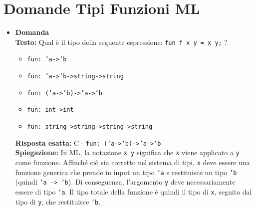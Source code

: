 \documentclass[12pt, a4paper]{article}
\newcounter{domandateoria}
\begin{document}
\section{Domande Tipi Funzioni ML}

\begin{itemize}
    \item {}\textbf{Domanda \thedomandateoria} \\
    \textbf{Testo:} Qual è il tipo della seguente espressione: \texttt{fun f x y = x y;} ?
    \begin{itemize}
        \item[A)] \texttt{fun: 'a->'b}
        \item[B)] \texttt{fun: 'a->'b->string->string}
        \item[C)] \texttt{fun: ('a->'b)->'a->'b}
        \item[D)] \texttt{fun: int->int}
        \item[E)] \texttt{fun: string->string->string->string}
    \end{itemize}
    \textbf{Risposta esatta:} C - \texttt{fun: ('a->'b)->'a->'b} \\
    \textbf{Spiegazione:} In ML, la notazione \texttt{x y} significa che \texttt{x} viene applicato a \texttt{y} come funzione. Affinché ciò sia corretto nel sistema di tipi, \texttt{x} deve essere una funzione generica che prende in input un tipo \texttt{'a} e restituisce un tipo \texttt{'b} (quindi \texttt{'a -> 'b}). Di conseguenza, l'argomento \texttt{y} deve necessariamente essere di tipo \texttt{'a}. Il tipo totale della funzione è quindi il tipo di \texttt{x}, seguito dal tipo di \texttt{y}, che restituisce \texttt{'b}.
    \vspace{0.3cm}

\newpage


\end{itemize}
\end{document}
